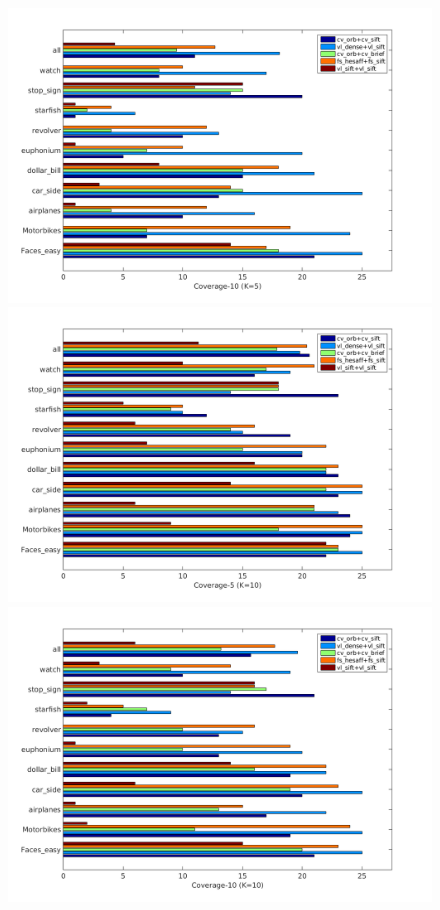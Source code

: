 \documentclass[review]{elsarticle}
\begin{document}
\begin{figure}[h!]
\begin{center}
{\includegraphics[height=0.4\linewidth,width=0.49\linewidth]{resources/antti_results/BeyondSingleBestmatch/metaPar_Cov10_K5_new.png}}\\
{\includegraphics[height=0.4\linewidth,width=0.49\linewidth]{resources/antti_results/BeyondSingleBestmatch/metaPar_Cov5_K10_new.png}}
{\includegraphics[height=0.4\linewidth,width=0.49\linewidth]{resources/antti_results/BeyondSingleBestmatch/metaPar_Cov10_K10_new.png}} \\

\end{center}
\end{figure}
\end{document}
